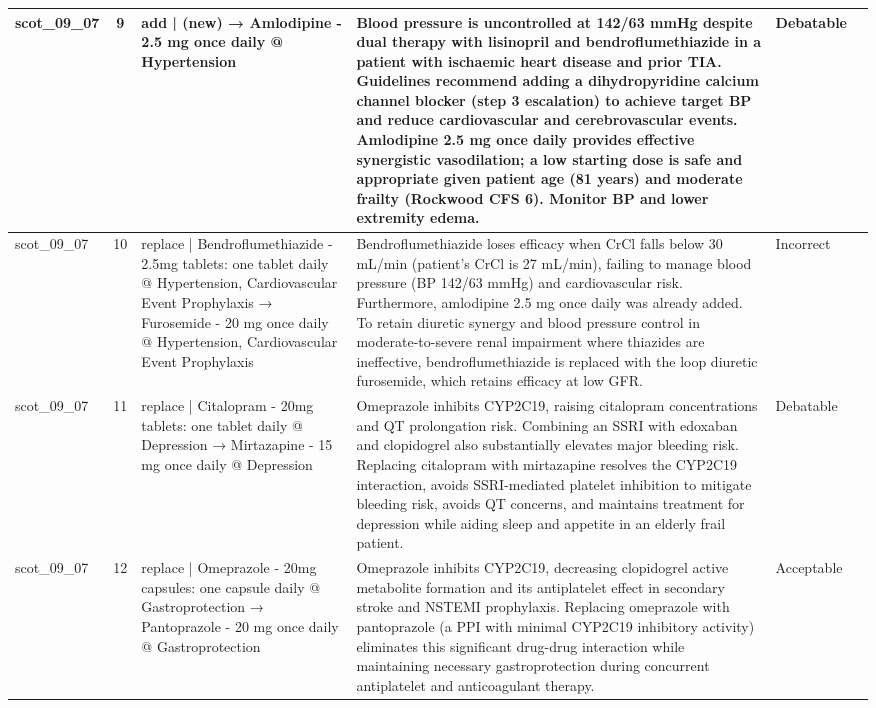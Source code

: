 \begin{longtable}{|p{1.45cm}|c|p{3.3cm}|p{6.5cm}|p{1.55cm}|p{2.3cm}|}
\hline
scot\_09\_07 & 9 & add | (new) → Amlodipine - 2.5 mg once daily @ Hypertension & Blood pressure is uncontrolled at 142/63 mmHg despite dual therapy with lisinopril and bendroflumethiazide in a patient with ischaemic heart disease and prior TIA. Guidelines recommend adding a dihydropyridine calcium channel blocker (step 3 escalation) to achieve target BP and reduce cardiovascular and cerebrovascular events. Amlodipine 2.5 mg once daily provides effective synergistic vasodilation; a low starting dose is safe and appropriate given patient age (81 years) and moderate frailty (Rockwood CFS 6). Monitor BP and lower extremity edema. & Debatable &  \\
\hline
scot\_09\_07 & 10 & replace | Bendroflumethiazide - 2.5mg tablets: one tablet daily @ Hypertension, Cardiovascular Event Prophylaxis → Furosemide - 20 mg once daily @ Hypertension, Cardiovascular Event Prophylaxis & Bendroflumethiazide loses efficacy when CrCl falls below 30 mL/min (patient's CrCl is 27 mL/min), failing to manage blood pressure (BP 142/63 mmHg) and cardiovascular risk. Furthermore, amlodipine 2.5 mg once daily was already added. To retain diuretic synergy and blood pressure control in moderate-to-severe renal impairment where thiazides are ineffective, bendroflumethiazide is replaced with the loop diuretic furosemide, which retains efficacy at low GFR. & Incorrect &  \\
\hline
scot\_09\_07 & 11 & replace | Citalopram - 20mg tablets: one tablet daily @ Depression → Mirtazapine - 15 mg once daily @ Depression & Omeprazole inhibits CYP2C19, raising citalopram concentrations and QT prolongation risk. Combining an SSRI with edoxaban and clopidogrel also substantially elevates major bleeding risk. Replacing citalopram with mirtazapine resolves the CYP2C19 interaction, avoids SSRI-mediated platelet inhibition to mitigate bleeding risk, avoids QT concerns, and maintains treatment for depression while aiding sleep and appetite in an elderly frail patient. & Debatable &  \\
\hline
scot\_09\_07 & 12 & replace | Omeprazole - 20mg capsules: one capsule daily @ Gastroprotection → Pantoprazole - 20 mg once daily @ Gastroprotection & Omeprazole inhibits CYP2C19, decreasing clopidogrel active metabolite formation and its antiplatelet effect in secondary stroke and NSTEMI prophylaxis. Replacing omeprazole with pantoprazole (a PPI with minimal CYP2C19 inhibitory activity) eliminates this significant drug-drug interaction while maintaining necessary gastroprotection during concurrent antiplatelet and anticoagulant therapy. & Acceptable &  \\

\end{longtable}
